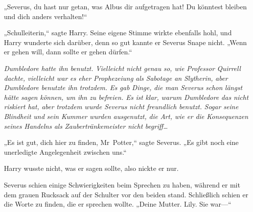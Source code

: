 „Severus, du hast nur getan, was Albus dir aufgetragen hat! Du könntest bleiben und dich anders verhalten!“

„Schulleiterin,“ sagte Harry.
Seine eigene Stimme wirkte ebenfalls hohl, und Harry wunderte sich darüber, denn so gut kannte er Severus Snape nicht.
„Wenn er gehen will, dann sollte er gehen dürfen.“

\emph{Dumbledore hatte ihn benutzt. Vielleicht nicht genau so, wie Professor Quirrell dachte, vielleicht war es eher Prophezeiung als Sabotage an Slytherin, aber Dumbledore benutzte ihn trotzdem. Es gab Dinge, die man Severus schon längst hätte sagen können, um ihn zu befreien. Es ist klar, warum Dumbledore das nicht riskiert hat, aber trotzdem wurde Severus nicht freundlich benutzt. Sogar seine Blindheit und sein Kummer wurden ausgenutzt, die Art, wie er die Konsequenzen seines Handelns als Zaubertränkemeister nicht begriff…}

„Es ist gut, dich hier zu finden, Mr~Potter,“ sagte Severus. „Es gibt noch eine unerledigte Angelegenheit zwischen uns.“

Harry wusste nicht, was er sagen sollte, also nickte er nur.

Severus schien einige Schwierigkeiten beim Sprechen zu haben, während er mit dem grauen Rucksack auf der Schulter vor den beiden stand. Schließlich schien er die Worte zu finden, die er sprechen wollte.
„Deine Mutter. Lily. Sie war—“

